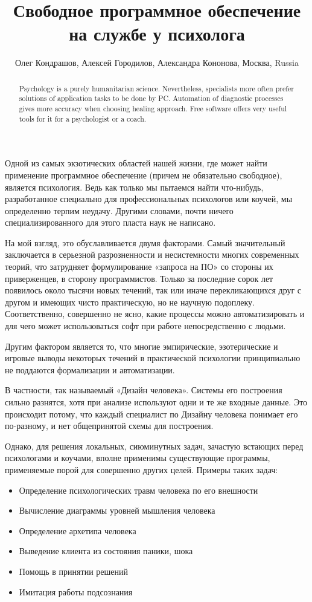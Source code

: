 \documentclass[10pt, a5paper]{article}
\begin{document}
\title{Свободное программное обеспечение на службе у психолога}
\author{Олег Кондрашов, Алексей Городилов, Александра Кононова, Москва, Russia}
\maketitle
\begin{abstract}
Psychology is a purely humanitarian science. Nevertheless, specialists more often prefer solutions of application tasks to be done by PC. Automation of diagnostic processes gives more accuracy when choosing healing approach. Free software offers very useful tools for it for a psychologist or a coach.
\end{abstract}
Одной из самых экзотических областей нашей жизни, где может найти применение программное обеспечение (причем не обязательно свободное), является психология. Ведь как только мы пытаемся найти что-нибудь, разработанное специально для профессиональных психологов или коучей, мы определенно терпим неудачу. Другими словами, почти ничего специализированного для этого пласта наук не написано.

На мой взгляд, это обуславливается двумя факторами. Самый значительный заключается в серьезной разрозненности и несистемности многих современных теорий, что затрудняет формулирование «запроса на ПО» со стороны их приверженцев, в сторону программистов. Только за последние сорок лет появилось около тысячи новых течений, так или иначе перекликающихся друг с другом и имеющих чисто практическую, но не научную подоплеку. Соответственно, совершенно не ясно, какие процессы можно автоматизировать и для чего может использоваться софт при работе непосредственно с людьми.

Другим фактором является то, что многие эмпирические, эзотерические и игровые выводы некоторых течений в практической психологии принципиально не поддаются формализации и автоматизации.

В частности, так называемый «Дизайн человека». Системы его построения сильно разнятся, хотя при анализе используют одни и те же входные данные. Это происходит потому, что каждый специалист по Дизайну человека понимает его по-разному, и нет общепринятой схемы для построения.

Однако, для решения локальных, сиюминутных задач, зачастую встающих перед психологами и коучами, вполне применимы существующие программы, применяемые порой для совершенно других целей. Примеры таких задач:
\begin{itemize}
 \item	Определение психологических травм человека по его внешности
 \item	Вычисление диаграммы уровней мышления человека
 \item	Определение архетипа человека
 \item	Выведение клиента из состояния паники, шока
 \item	Помощь в принятии решений
 \item	Имитация работы подсознания
\end{itemize}
\end{document}
